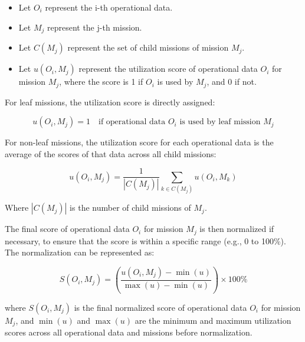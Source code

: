 \documentclass[]{article}
\begin{document}
\begin{itemize}
  \item Let \( O_i \) represent the i-th operational data.
  \item Let \( M_j \) represent the j-th mission.
  \item Let \( C(M_j) \) represent the set of child missions of mission \( M_j \).
  \item Let \( u(O_i, M_j) \) represent the utilization score of operational data \( O_i \) for mission \( M_j \), where the score is 1 if \( O_i \) is used by \( M_j \), and 0 if not.
\end{itemize}

For leaf missions, the utilization score is directly assigned:

\[ u(O_i, M_j) = 1 \quad \text{if operational data } O_i \text{ is used by leaf mission } M_j \]

For non-leaf missions, the utilization score for each operational data is the average of the scores of that data across all child missions:

\[ u(O_i, M_j) = \frac{1}{|C(M_j)|} \sum_{k \in C(M_j)} u(O_i, M_k) \]

Where \( |C(M_j)| \) is the number of child missions of \( M_j \).

The final score of operational data \( O_i \) for mission \( M_j \) is then normalized if necessary, to ensure that the score is within a specific range (e.g., 0 to 100\%). The normalization can be represented as:

\[ S(O_i, M_j) = \left( \frac{u(O_i, M_j) - \min(u)}{\max(u) - \min(u)} \right) \times 100 \% \]

where \( S(O_i, M_j) \) is the final normalized score of operational data \( O_i \) for mission \( M_j \), and \( \min(u) \) and \( \max(u) \) are the minimum and maximum utilization scores across all operational data and missions before normalization.
\end{document}
